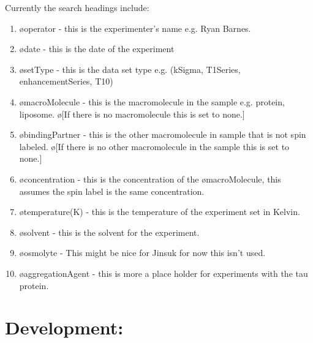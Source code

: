 \documentclass[10pt]{book}
\begin{document}
Currently the search headings include:
\begin{enumerate}
    \item \o{operator} - this is the experimenter's name e.g. Ryan Barnes.
    \item \o{date} - this is the date of the experiment
    \item \o{setType} - this is the data set type e.g. (kSigma, T1Series, enhancementSeries, T10)
    \item \o{macroMolecule} - this is the macromolecule in the sample e.g. protein, liposome. \o[If there is no macromolecule this is set to none.]{} 
    \item \o{bindingPartner} - this is the other macromolecule in sample that is not spin labeled. \o[If there is no other macromolecule in the sample this is set to none.]{} 
    \item \o{concentration} - this is the concentration of the \o{macroMolecule}, this assumes the spin label is the same concentration.
    \item \o{temperature(K)} - this is the temperature of the experiment set in Kelvin.
    \item \o{solvent} - this is the solvent for the experiment.
    \item \o{osmolyte} - This might be nice for Jinsuk for now this isn't used.
    \item \o{aggregationAgent} - this is more a place holder for experiments with the tau protein.
\end{enumerate}


\section{Development:}
\end{document}
